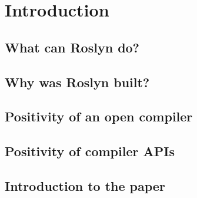 \chapter{Introduction}
\label{ch:introduction}

\section{What can Roslyn do?}
\label{sec:intro-what}


\section{Why was Roslyn built?}
\label{sec:intro-why}


\section{Positivity of an open compiler}
\label{sec:intro-pos-comp}


\section{Positivity of compiler APIs}
\label{sec:intro-pos-api}


\section{Introduction to the paper}
\label{sec-intro-paper}